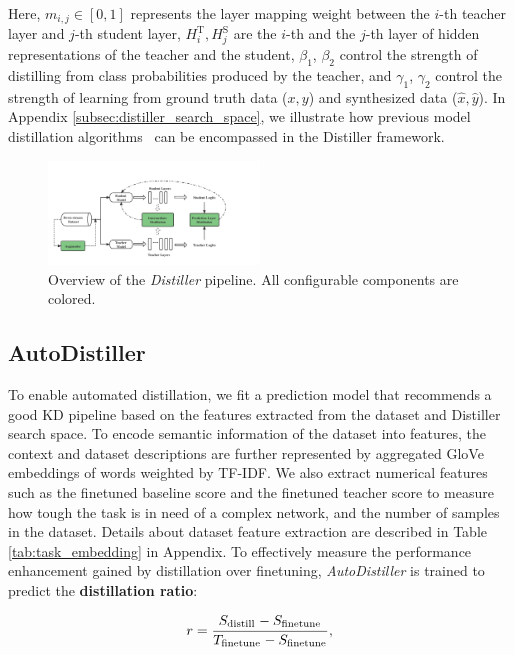 \documentclass[11pt]{article}
\begin{document}
Here, $m_{i, j} \in [0, 1]$ represents the layer mapping weight between the $i$-th teacher layer and $j$-th student layer, $H_i^\text{T}, H_j^\text{S}$ are the $i$-th and the $j$-th layer of hidden representations of the teacher and the student, $\beta_1$, $\beta_2$ control the strength of distilling from class probabilities produced by the teacher, and $\gamma_1$, $\gamma_2$ control the strength of learning from ground truth data ($x,y$) and synthesized data ($\hat{x},\hat{y}$). In Appendix \ref{subsec:distiller_search_space}, we illustrate how previous model distillation algorithms~\citep{jiao2019tinybert, li2020bert, liang2020mixkd} can be encompassed in the Distiller framework.
\begin{figure}[tb!]
  \centering
  \includegraphics[width=0.5\textwidth]{pics/Distiller.png}
  \caption{Overview of the \emph{Distiller} pipeline. All configurable components are colored.}
\end{figure}




\subsection{AutoDistiller}
To enable automated distillation, we fit a prediction model that recommends a good KD pipeline based on the features extracted from the dataset and Distiller search space. To encode semantic information of the dataset into features, the context and dataset descriptions are further represented by aggregated GloVe \citep{pennington2014glove} embeddings of words weighted by TF-IDF. We also extract numerical features such as the finetuned baseline score and the finetuned teacher score to measure how tough the task is in need of a complex network, and the number of samples in the dataset. Details about dataset feature extraction are described in Table \ref{tab:task_embedding} in Appendix. To effectively measure the performance enhancement gained by distillation over finetuning, \emph{AutoDistiller} is trained to predict the \textbf{distillation ratio}:
\begin{footnotesize}
\begin{equation}
    r=\frac{S_\textsuperscript{distill}-S_\textsuperscript{finetune}}{T_\textsuperscript{finetune}-S_\textsuperscript{finetune}},
\end{equation}
\end{footnotesize}
\end{document}
